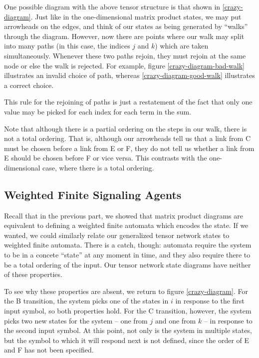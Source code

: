 \documentclass[12pt]{amsbook}
\theoremstyle{plain}
\theoremstyle{definition}
\theoremstyle{remark}
\begin{document}
One possible diagram with the above tensor structure is that shown in \ref{crazy-diagram}.  Just like in the one-dimensional matrix product states, we may put arrowheads on the edges, and think of our states as being generated by ``walks'' through the diagram.  However, now there are points where our walk may split into many paths (in this case, the indices $j$ and $k$) which are taken simultaneously.  Whenever these two paths rejoin, they must rejoin at the same node or else the walk is rejected.  For example, figure \ref{crazy-diagram-bad-walk} illustrates an invalid choice of path, whereas \ref{crazy-diagram-good-walk} illustrates a correct choice.

This rule for the rejoining of paths is just a restatement of the fact that only one value may be picked for each index for each term in the sum.

Note that although there is a partial ordering on the steps in our walk, there is not a total ordering.  That is, although our arrowheads tell us that a link from C must be chosen before a link from E or F, they do not tell us whether a link from E should be chosen before F or vice versa.  This contrasts with the one-dimensional case, where there is a total ordering.
\subsection{Weighted Finite Signaling Agents}

Recall that in the previous part, we showed that matrix product diagrams are equivalent to defining a weighted finite automata which encodes the state.  If we wanted, we could similarly relate our generalized tensor network states to weighted finite automata.  There is a catch, though:  automata require the system to be in a concete ``state'' at any moment in time, and they also require there to be a total ordering of the input.  Our tensor network state diagrams have neither of these properties.

To see why these properties are absent, we return to figure \ref{crazy-diagram}.  For the B transition, the system picks one of the states in $i$ in response to the first input symbol, so both properties hold.  For the C transition, however, the system picks two new states for the system -- one from $j$ and one from $k$ -- in response to the second input symbol.  At this point, not only is the system in multiple states, but the symbol to which it will respond next is not defined, since the order of E and F has not been specified.
\end{document}
